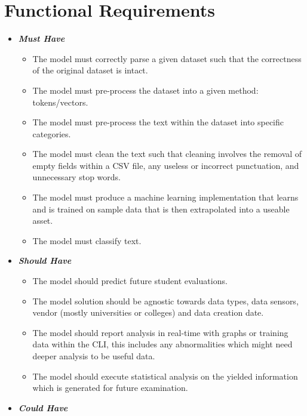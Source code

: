 \section{Functional Requirements} \label{section:FunctionalRequirements}

\begin{itemize}
    \item \textbf{\textit{Must Have}}
        \begin{itemize}\label{FMH}
            \item The model must correctly parse a given dataset such that the correctness of the original dataset is intact.
            \item The model must pre-process the dataset into a given method: tokens/vectors.
            \item The model must pre-process the text within the dataset into specific categories.
            \item The model must clean the text such that cleaning involves the removal of empty fields within a CSV file, any useless or incorrect punctuation, and unnecessary stop words.
            \item The model must produce a machine learning implementation that learns and is trained on sample data that is then extrapolated into a useable asset.
            \item The model must classify text.
        \end{itemize}
    \item \textbf{\textit{Should Have}}
        \begin{itemize}\label{FSH}
            \item The model should predict future student evaluations.
            \item The model solution should be agnostic towards data types, data sensors, vendor (mostly universities or colleges) and data creation date.
            \item The model should report analysis in real-time with graphs or training data within the CLI, this includes any abnormalities which might need deeper analysis to be useful data.
            \item The model should execute statistical analysis on the yielded information which is generated for future examination.
        \end{itemize}
    \item \textbf{\textit{Could Have}}

\end{itemize}
